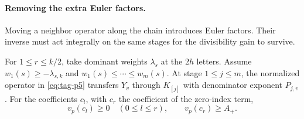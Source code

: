 \paragraph{Removing the extra Euler factors.}

Moving a neighbor operator along the chain introduces Euler factors. Their inverse must act integrally on the same stages for the divisibility gain to survive.

\begin{proposition}\label{prop:hecke-period-euler-inverse}
For \(1\le r\le k/2\), take dominant weights \(\lambda_s\) at the
\(2h\) letters. Assume \(w_1(s)\ge-\lambda_{s,k}\) and
\(w_1(s)\le\cdots\le w_m(s)\). At stage \(1\le j\le m\), the
normalized operator in \textup{\eqref{eq:tag-p5}} transfers \(Y_v\) through
\(K_{[j]}\) with denominator exponent \(P_{j,v}\). For the coefficients \(c_l\), with \(c_r\) the coefficient of the zero-index term,
\[
 v_p(c_l)\ge0\quad(0\le l\le r),\qquad v_p(c_r)\ge A_+.
\]

\end{proposition}

